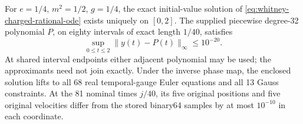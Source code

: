 \begin{proposition}
\label{prop:whitney-charged-time-enclosure}
For \(e=1/4\), \(m^2=1/2\), \(g=1/4\), the exact initial-value solution
of \eqref{eq:whitney-charged-rational-ode} exists uniquely on \([0,2]\).
The supplied piecewise degree-32 polynomial \(P\), on eighty intervals
of exact length \(1/40\), satisfies
\begin{equation}
 \sup_{0\leq t\leq2}\|y(t)-P(t)\|_\infty\leq10^{-20}.
 \label{eq:whitney-charged-time-enclosure}
\end{equation}
At shared interval endpoints either adjacent polynomial may be used;
the approximants need not join exactly. Under the inverse phase map, the
enclosed solution lifts to all 68 real temporal-gauge Euler equations and
all 13 Gauss constraints. At the 81 nominal times \(j/40\), its five
original positions and five original velocities differ from the stored binary64 samples by at most \(10^{-10}\) in each coordinate.
\end{proposition}

